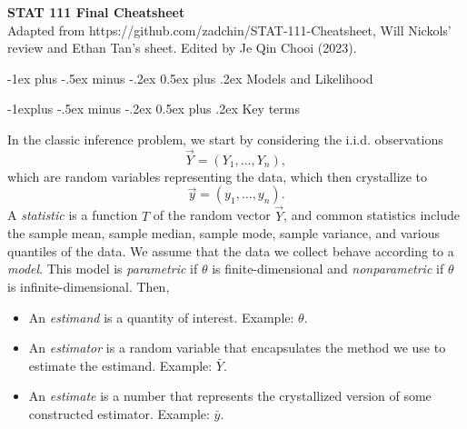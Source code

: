 \documentclass[10pt,landscape]{article}
\makeatletter
\renewcommand{\section}{\@startsection{section}{1}{0mm}%
                                {-1ex plus -.5ex minus -.2ex}%
                                {0.5ex plus .2ex}%
                                {\normalfont\large\bfseries}}
\renewcommand{\subsection}{\@startsection{subsection}{2}{0mm}%
                                {-1explus -.5ex minus -.2ex}%
                                {0.5ex plus .2ex}%
                                {\normalfont\normalsize\bfseries}}
\makeatother
\begin{document}
\raggedright
\footnotesize
\begin{multicols*}{3}

\setlength{\premulticols}{1pt}
\setlength{\postmulticols}{1pt}
\setlength{\multicolsep}{1pt}
\setlength{\columnsep}{2pt}



    {\color{blue} \Large{\textbf{STAT 111 Final Cheatsheet}}} \\



\scriptsize
 Adapted from https://github.com/zadchin/STAT-111-Cheatsheet, Will Nickols' review and Ethan Tan's sheet. Edited by Je Qin Chooi (2023).



\scriptsize



\section{Models and Likelihood}

\subsection{Key terms}

In the classic inference problem, we start by considering the i.i.d. observations $$\vec Y=(Y_1,\dots,Y_n),$$ which are random variables representing the data, which then crystallize to $$\vec y=(y_1,\dots,y_n).$$ A \emph{statistic} is a function $T$ of the random vector $\vec Y$, and common statistics include the sample mean, sample median, sample mode, sample variance, and various quantiles of the data. We assume that the data we collect behave according to a \emph{model}. This model is \emph{parametric} if $\theta$ is finite-dimensional and \emph{nonparametric} if $\theta$ is infinite-dimensional. Then,
\begin{itemize}
    \item An \emph{estimand} is a quantity of interest. Example: $\theta$.
    \item An \emph{estimator} is a random variable that encapsulates the method we use to estimate the estimand. Example: $\bar{Y}$.
    \item An \emph{estimate} is a number that represents the crystallized version of some constructed estimator. Example: $\bar{y}$.
\end{itemize}


\end{multicols*}
\end{document}
